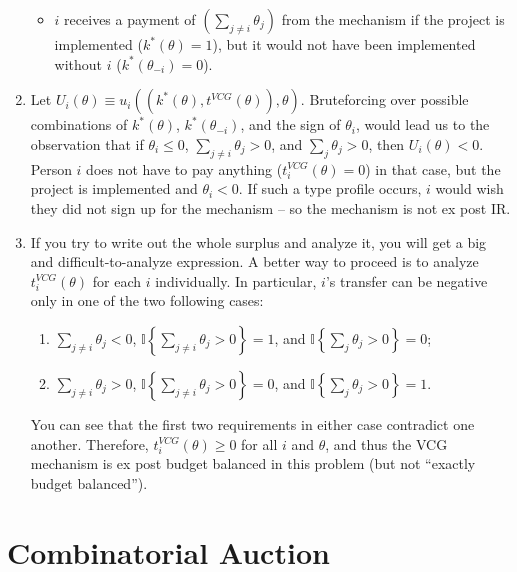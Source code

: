 \documentclass[a4paper]{article}
\begin{document}
\begin{enumerate}
\begin{itemize}
			\item $i$ receives a payment of $\left(\sum_{j\neq i} \theta_j \right)$ from the mechanism if the project is implemented ($k^*(\theta)=1$), but it would not have been implemented without $i$ ($k^*(\theta_{-i})=0$).
		\end{itemize}
		
		\item Let $U_i(\theta) \equiv u_i((k^*(\theta),t^{VCG}(\theta)),\theta)$. Bruteforcing over possible combinations of $k^*(\theta)$, $k^*(\theta_{-i})$, and the sign of $\theta_i$, would lead us to the observation that if $\theta_i \leq 0$, $\sum_{j \neq i} \theta_j > 0$, and $\sum_j \theta_j > 0$, then $U_i(\theta) < 0$. Person $i$ does not have to pay anything ($t^{VCG}_i(\theta)=0$) in that case, but the project is implemented and $\theta_i < 0$. If such a type profile occurs, $i$ would wish they did not sign up for the mechanism -- so the mechanism is not ex post IR.
		
		\item If you try to write out the whole surplus and analyze it, you will get a big and difficult-to-analyze expression. A better way to proceed is to analyze $t_i^{VCG}(\theta)$ for each $i$ individually. In particular, $i$'s transfer can be negative only in one of the two following cases:
		\begin{enumerate}
			\item $\sum_{j\neq i} \theta_j < 0$, $\mathbb{I}\left\{ \sum_{j \neq i} \theta_j > 0 \right\}=1$, and $\mathbb{I}\left\{ \sum_j \theta_j > 0 \right\}=0$;
			\item $\sum_{j\neq i} \theta_j > 0$, $\mathbb{I}\left\{ \sum_{j \neq i} \theta_j > 0 \right\}=0$, and $\mathbb{I}\left\{ \sum_j \theta_j > 0 \right\}=1$.
		\end{enumerate}
		You can see that the first two requirements in either case contradict one another. Therefore, $t_i^{VCG}(\theta) \geq 0$ for all $i$ and $\theta$, and thus the VCG mechanism is ex post budget balanced in this problem (but not ``exactly budget balanced'').
	\end{enumerate}
\fi



\section{Combinatorial Auction}
\end{document}
